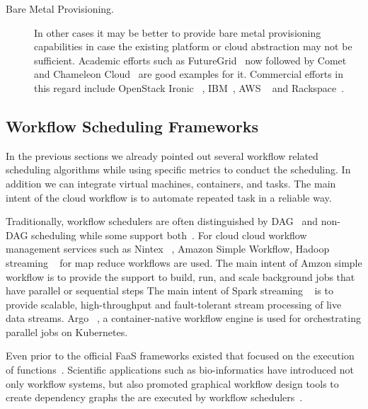 \documentclass[final,5p,times,twocolumn]{elsarticle}
\begin{document}
\begin{description}
\item[Bare Metal Provisioning.] In other cases it may be better to
  provide bare metal provisioning capabilities in case the
  existing platform or cloud abstraction may not be sufficient.
  Academic efforts such as FutureGrid~\cite{fox2013futuregrid} now
  followed by Comet~\cite{las-comet} and Chameleon Cloud~\cite{Chameleoncloud2019} 
  are good examples for it. Commercial
  efforts in this regard include OpenStack Ironic
 ~\cite{OpenstackIronic2019}, IBM~\cite{IBMBareMetal2019}, AWS
 ~\cite{AWS2019} and Rackspace~\cite{Rackspace2019}.

\end{description}







\subsection{Workflow Scheduling Frameworks} 
\label{sec:workflow}



In the previous sections we already pointed out several workflow
related scheduling algorithms while using specific metrics to conduct
the scheduling. In addition we can integrate virtual machines,
containers, and tasks. The main intent of the cloud workflow is to automate
repeated task in a reliable way. 


Traditionally, workflow schedulers are often distinguished by
DAG~\cite{deelman2005pegasus,deelman2004pegasus,thain2005distributed}
and non-DAG scheduling while some support
both~\cite{las-karajan,las-cogkit-1,las06-workflow-book}.
For cloud cloud workflow management services such as
Nintex ~\cite{www-nintex-wf}, Amazon Simple Workflow,
Hadoop streaming ~\cite{www-hadoop-streaming} for
map reduce workflows are used. The main intent of Amzon
simple workflow is to provide the support to build,
run, and scale background jobs that have parallel or
sequential steps The main intent of Spark
streaming ~\cite{www-spark-streaming} is to provide scalable,
high-throughput and fault-tolerant
stream processing of live data streams. Argo ~\cite{www-argo-wf},
a container-native workflow
engine is used for orchestrating parallel jobs on Kubernetes.

 Even prior
to the official FaaS frameworks existed that focused on the execution
of functions~\cite{las-infogram}.  Scientific applications such as
bio-informatics have introduced not only workflow systems, but also
promoted graphical workflow design tools to create dependency graphs
the are executed by workflow
schedulers~\cite{oinn2004taverna,tan2010comparison}.
  
\end{document}
